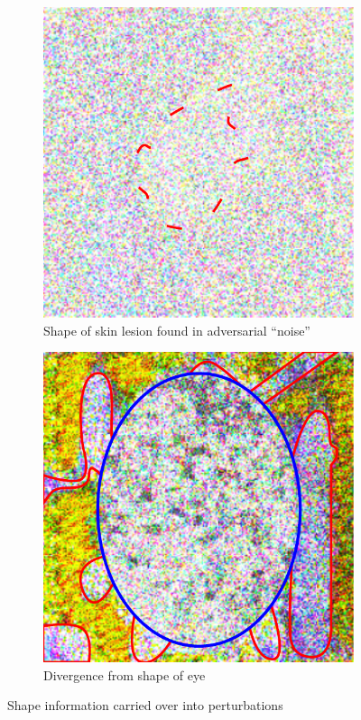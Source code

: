 \begin{figure}[h]
    \centering
    \begin{subfigure}{.4\linewidth}
      \centering
      \includegraphics[width=\linewidth]{graphics/ResNet-50/LesionOutline.pdf}
      \caption{Shape of skin lesion found in adversarial ``noise''\\}
      \label{LesionShape}
    \end{subfigure}
    \begin{subfigure}{.4\linewidth}
      \centering
      \includegraphics[width=\linewidth]{graphics/ResNet-50/EyeShapeDivergence.pdf}
      \caption{Divergence from shape of eye\\}
      \label{EyeShapeDivergence}
    \end{subfigure}
    \caption{Shape information carried over into perturbations}
  \end{figure}